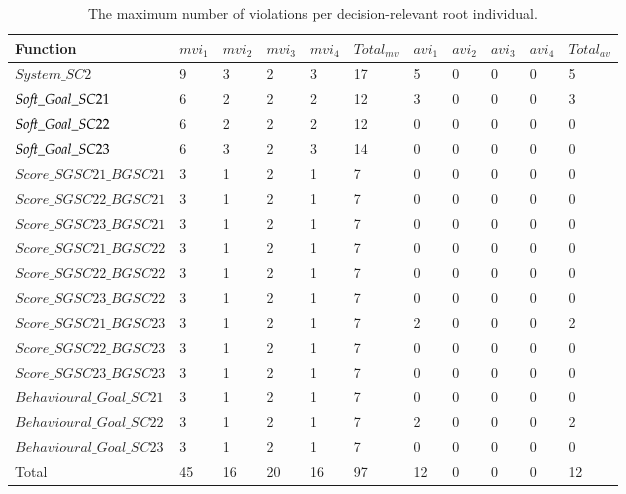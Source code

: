 \begin{table}[H]
\centering
\caption{The maximum number of violations per decision-relevant root individual.}
\begin{tabular}{| p{4cm} | p{0.7cm} | p{0.7cm} | p{0.7cm} | p{0.7cm} | p{1.2cm} | p{0.7cm} | p{0.7cm} | p{0.7cm} | p{0.7cm} | p{1.1cm} |}
\hline
\rowcolor{document}
\color{documentText}Function & \color{documentText}$mvi_1$ & \color{documentText}$mvi_2$ & \color{documentText}$mvi_3$ & \color{documentText}$mvi_4$ & \color{documentText}$Total_{mv}$ & \color{documentText}$avi_1$ & \color{documentText}$avi_2$ & \color{documentText}$avi_3$ & \color{documentText}$avi_4$ & \color{documentText}$Total_{av}$ \\
\hline
$System\_SC2$ 				& 9 & 3 & 2 & 3 & 17 & 5 & 0 & 0 & 0 & 5\\
\hdashline
$So{\mkern-2mu f\mkern-3mu}t\_Goal\_SC21$ 			& 6 & 2 & 2 & 2 & 12 & 3 & 0 & 0 & 0 & 3\\
\hdashline
$So{\mkern-2mu f\mkern-3mu}t\_Goal\_SC22$ 			& 6 & 2 & 2 & 2 & 12 & 0 & 0 & 0 & 0 & 0\\
\hdashline
$So{\mkern-2mu f\mkern-3mu}t\_Goal\_SC23$ 			& 6 & 3 & 2 & 3 & 14 & 0 & 0 & 0 & 0 & 0\\
\hdashline
$Score\_SGSC21\_BGSC21$ 	& 3 & 1 & 2 & 1 & 7 & 0 & 0 & 0 & 0 & 0\\
\hdashline
$Score\_SGSC22\_BGSC21$ 	& 3 & 1 & 2 & 1 & 7 & 0 & 0 & 0 & 0 & 0\\
\hdashline
$Score\_SGSC23\_BGSC21$ 	& 3 & 1 & 2 & 1 & 7 & 0 & 0 & 0 & 0 & 0\\
\hdashline
$Score\_SGSC21\_BGSC22$		& 3 & 1 & 2 & 1 & 7 & 0 & 0 & 0 & 0 & 0\\
\hdashline
$Score\_SGSC22\_BGSC22$		& 3 & 1 & 2 & 1 & 7 & 0 & 0 & 0 & 0 & 0\\
\hdashline
$Score\_SGSC23\_BGSC22$		& 3 & 1 & 2 & 1 & 7 & 0 & 0 & 0 & 0 & 0\\
\hdashline
$Score\_SGSC21\_BGSC23$		& 3 & 1 & 2 & 1 & 7 & 2 & 0 & 0 & 0 & 2\\
\hdashline
$Score\_SGSC22\_BGSC23$		& 3 & 1 & 2 & 1 & 7 & 0 & 0 & 0 & 0 & 0\\
\hdashline
$Score\_SGSC23\_BGSC23$		& 3 & 1 & 2 & 1 & 7 & 0 & 0 & 0 & 0 & 0\\
\hdashline
$Behavioural\_Goal\_SC21$	& 3 & 1 & 2 & 1 & 7 & 0 & 0 & 0 & 0 & 0\\
\hdashline
$Behavioural\_Goal\_SC22$	& 3 & 1 & 2 & 1 & 7 & 2 & 0 & 0 & 0 & 2\\
\hdashline
$Behavioural\_Goal\_SC23$	& 3 & 1 & 2 & 1 & 7 & 0 & 0 & 0 & 0 & 0\\
\hdashline
Total 						& 45 & 16 & 20 & 16 & 97 & 12 & 0 & 0 & 0 & 12 \\
\hline
\end{tabular}
\label{table:as_maximum_evidence_dec1}
\end{table}

